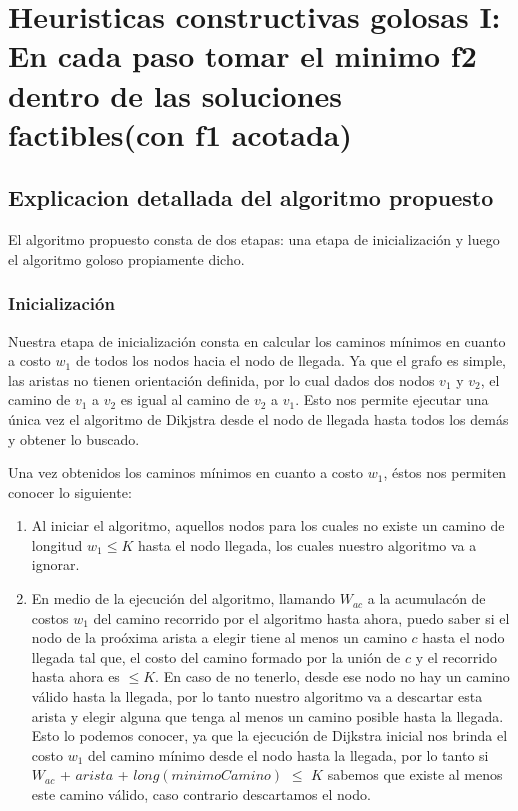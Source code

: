 \section{Heuristicas constructivas golosas I: En cada paso tomar el minimo f2 dentro de las soluciones factibles(con f1 acotada)}
\subsection{Explicacion detallada del algoritmo propuesto}

El algoritmo propuesto consta de dos etapas: una etapa de inicializaci\'on y luego el algoritmo goloso propiamente dicho.

\subsubsection{Inicializaci\'on}

Nuestra etapa de inicializaci\'on consta en calcular los caminos m\'inimos en cuanto a costo $w_1$ de todos los nodos hacia el nodo de llegada. Ya que el grafo es simple, las aristas no tienen orientaci\'on definida, por lo cual dados dos nodos $v_1$ y $v_2$, el camino de $v_1$ a $v_2$ es igual al camino de $v_2$ a $v_1$. Esto nos permite ejecutar una \'unica vez el algoritmo de Dikjstra desde el nodo de llegada hasta todos los dem\'as y obtener lo buscado.

\vspace{2mm}

Una vez obtenidos los caminos m\'inimos en cuanto a costo $w_1$, \'estos nos permiten conocer lo siguiente:

\begin{enumerate}
\item Al iniciar el algoritmo, aquellos nodos para los cuales no existe un camino de longitud $w_1 \leq K$ hasta el nodo llegada, los cuales nuestro algoritmo va a ignorar.
\item En medio de la ejecuci\'on del algoritmo, llamando $W_{ac}$ a la acumulac\'on de costos $w_1$ del camino recorrido por el algoritmo hasta ahora, puedo saber si el nodo de la pro\'oxima arista a elegir tiene al menos un camino $c$ hasta el nodo llegada tal que, el costo del camino formado por la uni\'on de $c$ y el recorrido hasta ahora es $\leq K$. En caso de no tenerlo, desde ese nodo no hay un camino v\'alido hasta la llegada, por lo tanto nuestro algoritmo va a descartar esta arista y elegir alguna que tenga al menos un camino posible hasta la llegada. Esto lo podemos conocer, ya que la ejecuci\'on de Dijkstra inicial nos brinda el costo $w_1$ del camino m\'inimo desde el nodo hasta la llegada, por lo tanto  si $W_{ac}$ + $arista$ + $long(minimoCamino)$ $\leq$ $K$ sabemos que existe al menos este camino v\'alido, caso contrario descartamos el nodo.
\end{enumerate}

